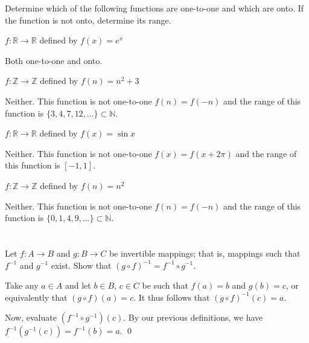 Determine which of the following functions are one-to-one and which are onto. If the function is not onto, determine its range.
\hr
\begin{exlist}
    \item $f : \mathbb{R} \rightarrow \mathbb{R}$ defined by $f(x) = e^x$

    \medskip

    Both one-to-one and onto.

    \item $f : \mathbb{Z} \rightarrow \mathbb{Z}$ defined by $f(n) = n^2 + 3$

    \medskip

    Neither. This function is not one-to-one \emdash $f(n) = f(-n)$ \emdash and the range of this function is $\{3, 4, 7, 12, \dots\} \subset \mathbb{N}$.

    \item $f : \mathbb{R} \rightarrow \mathbb{R}$ defined by $f(x) = \sin x$

    \medskip

    Neither. This function is not one-to-one \emdash $f(x) = f(x + 2\pi)$ \emdash and the range of this function is $[-1, 1]$.

    \item $f : \mathbb{Z} \rightarrow \mathbb{Z}$ defined by $f(n) = n^2$

    \medskip

    Neither. This function is not one-to-one \emdash $f(n) = f(-n)$ \emdash and the range of this function is $\{0, 1, 4, 9, \dots\} \subset \mathbb{N}$.
\end{exlist}
\pagebreak
\section{}\label{sec:1-19}

Let $f: A \rightarrow B$ and $g: B \rightarrow C$ be invertible mappings; that is, mappings such that $f^{-1}$ and $g^{-1}$ exist.
Show that $(g \circ f)^{-1} = f^{-1} \circ g^{-1}$.
\hr

Take any $a \in A$ and let $b \in B$, $c \in C$ be such that $f(a) = b$ and $g(b) = c$, or equivalently that $(g \circ f)(a) = c$. It thus follows that $(g \circ f)^{-1}(c) = a.$

Now, evaluate $(f^{-1} \circ g^{-1})(c)$. By our previous definitions, we have $f^{-1}(g^{-1}(c)) = f^{-1}(b) = a$.
\qed

\section{}\label{sec:1-20}

